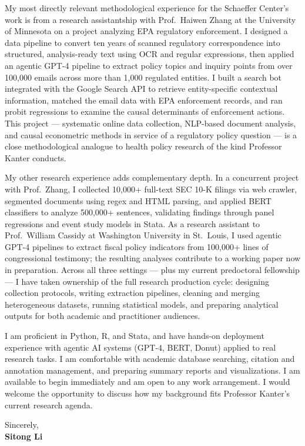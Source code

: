 \documentclass[12pt]{article}
\begin{document}
My most directly relevant methodological experience for the Schaeffer Center's work is from a research assistantship with Prof.\ Haiwen Zhang at the University of Minnesota on a project analyzing EPA regulatory enforcement. I designed a data pipeline to convert ten years of scanned regulatory correspondence into structured, analysis-ready text using OCR and regular expressions, then applied an agentic GPT-4 pipeline to extract policy topics and inquiry points from over 100,000 emails across more than 1,000 regulated entities. I built a search bot integrated with the Google Search API to retrieve entity-specific contextual information, matched the email data with EPA enforcement records, and ran probit regressions to examine the causal determinants of enforcement actions. This project --- systematic online data collection, NLP-based document analysis, and causal econometric methods in service of a regulatory policy question --- is a close methodological analogue to health policy research of the kind Professor Kanter conducts.

My other research experience adds complementary depth. In a concurrent project with Prof.\ Zhang, I collected 10,000+ full-text SEC 10-K filings via web crawler, segmented documents using regex and HTML parsing, and applied BERT classifiers to analyze 500,000+ sentences, validating findings through panel regressions and event study models in Stata. As a research assistant to Prof.\ William Cassidy at Washington University in St.\ Louis, I used agentic GPT-4 pipelines to extract fiscal policy indicators from 100,000+ lines of congressional testimony; the resulting analyses contribute to a working paper now in preparation. Across all three settings --- plus my current predoctoral fellowship --- I have taken ownership of the full research production cycle: designing collection protocols, writing extraction pipelines, cleaning and merging heterogeneous datasets, running statistical models, and preparing analytical outputs for both academic and practitioner audiences.

I am proficient in Python, R, and Stata, and have hands-on deployment experience with agentic AI systems (GPT-4, BERT, Donut) applied to real research tasks. I am comfortable with academic database searching, citation and annotation management, and preparing summary reports and visualizations. I am available to begin immediately and am open to any work arrangement. I would welcome the opportunity to discuss how my background fits Professor Kanter's current research agenda.

\vspace{1em}

\noindent Sincerely,\\[0.5em]
\textbf{Sitong Li}
\end{document}
